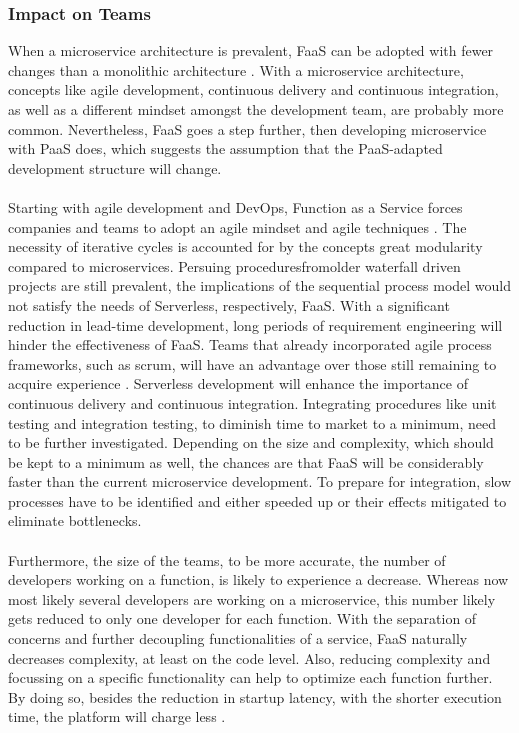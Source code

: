 \documentclass[a4paper,11pt, pagesize]{scrartcl}
\begin{document}
\begin{spacing}{1.2}
\subsubsection{Impact on Teams}When a microservice architecture is prevalent, FaaS can be adopted with fewer changes than a monolithic architecture \cite{fox2017status}. With a microservice architecture, concepts like agile development, continuous delivery and continuous integration, as well as a different mindset amongst the development team, are probably more common. Nevertheless, FaaS goes a step further, then developing microservice with PaaS does, which suggests the assumption that the PaaS-adapted development structure will change.\\\\ Starting with agile development and \glqq DevOps\grqq{}, Function as a Service forces companies and teams to adopt an agile mindset and agile techniques \cite{benlian2018transformative}. The necessity of iterative cycles is accounted for by the concepts great modularity compared to microservices. Persuing proceduresfromolder waterfall driven projects are still prevalent, the implications of the sequential process model would not satisfy the needs of Serverless, respectively, FaaS. With a significant reduction in lead-time development, long periods of requirement engineering will hinder the effectiveness of FaaS. Teams that already incorporated agile process frameworks, such as scrum, will have an advantage over those still remaining to acquire experience \cite{battleson2016achieving}. Serverless development will enhance the importance of continuous delivery and continuous integration. Integrating procedures like unit testing and integration testing, to diminish time to market to a minimum, need to be further investigated. Depending on the size and complexity, which should be kept to a minimum as well, the chances are that FaaS will be considerably faster than the current microservice development. To prepare for integration, slow processes have to be identified and either speeded up or their effects mitigated to eliminate bottlenecks.\\\\ Furthermore, the size of the teams, to be more accurate, the number of developers working on a function, is likely to experience a decrease. Whereas now most likely several developers are working on a microservice, this number likely gets reduced to only one developer for each function. With the separation of concerns and further decoupling functionalities of a service, FaaS naturally decreases complexity, at least on the code level. Also, reducing complexity and focussing on a specific functionality can help to optimize each function further. By doing so, besides the reduction in startup latency, with the shorter execution time, the platform will charge less \cite{shafiei2020serverless}.\\\\ 

\end{spacing}
\end{document}
